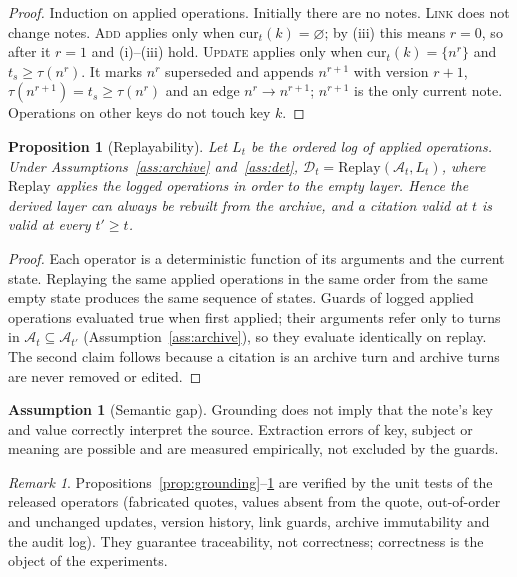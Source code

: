 \documentclass[10pt]{article}
\theoremstyle{plain}
\newtheorem{proposition}{Proposition}
\theoremstyle{definition}
\newtheorem{assumption}{Assumption}
\theoremstyle{remark}
\newtheorem{remark}{Remark}
\newcommand{\A}{\mathcal{A}}
\newcommand{\D}{\mathcal{D}}
\begin{document}
\begin{proof}
Induction on applied operations. Initially there are no notes. \textsc{Link} does
not change notes. \textsc{Add} applies only when $\mathrm{cur}_t(k)=\varnothing$;
by (iii) this means $r=0$, so after it $r=1$ and (i)--(iii) hold. \textsc{Update}
applies only when $\mathrm{cur}_t(k)=\{n^r\}$ and $t_s\ge\tau(n^r)$. It marks
$n^r$ superseded and appends $n^{r+1}$ with version $r+1$, $\tau(n^{r+1})=t_s\ge\tau(n^r)$
and an edge $n^r\to n^{r+1}$; $n^{r+1}$ is the only current note. Operations on
other keys do not touch key $k$.
\end{proof}

\begin{proposition}[Replayability]
\label{prop:replay}
Let $L_t$ be the ordered log of applied operations. Under Assumptions~\ref{ass:archive}
and~\ref{ass:det}, $\D_t=\mathrm{Replay}(\A_t,L_t)$, where $\mathrm{Replay}$ applies the
logged operations in order to the empty layer. Hence the derived layer can always
be rebuilt from the archive, and a citation valid at $t$ is valid at every
$t'\ge t$.
\end{proposition}

\begin{proof}
Each operator is a deterministic function of its arguments and the current state.
Replaying the same applied operations in the same order from the same empty state
produces the same sequence of states. Guards of logged applied operations
evaluated true when first applied; their arguments refer only to turns in
$\A_t\subseteq\A_{t'}$ (Assumption~\ref{ass:archive}), so they evaluate identically on
replay. The second claim follows because a citation is an archive turn and
archive turns are never removed or edited.
\end{proof}

\begin{assumption}[Semantic gap]
\label{ass:semantic}
Grounding does not imply that the note's key and value correctly interpret the
source. Extraction errors of key, subject or meaning are possible and are measured
empirically, not excluded by the guards.
\end{assumption}

\begin{remark}
Propositions~\ref{prop:grounding}--\ref{prop:replay} are verified by the unit tests of the released
operators (fabricated quotes, values absent from the quote, out-of-order and
unchanged updates, version history, link guards, archive immutability and the
audit log). They guarantee traceability, not correctness; correctness is the
object of the experiments.
\end{remark}
\end{document}
